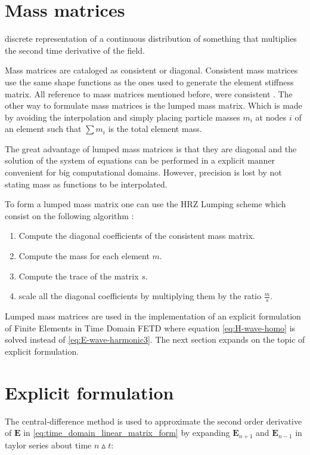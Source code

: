 \section{Mass matrices}
\label{sec:explicit_formulation}
discrete representation of a continuous distribution of something that multiplies the second time derivative of the field.

Mass matrices are cataloged as consistent or diagonal. Consistent mass matrices use the same shape functions as the ones used to generate the element stiffness matrix. All reference to mass matrices mentioned before, were consistent \cite{RobertD.Cook1989}. 
The other way to formulate mass matrices is the lumped mass matrix. Which is made by avoiding the interpolation and simply placing particle masses $m_i$ at nodes $i$ of an element such that $\sum m_i$ is the total element mass. 

The great advantage of lumped mass matrices is that they are diagonal and the solution of the system of equations can be performed in a explicit manner convenient for big computational domains.
However, precision is lost by not stating mass as functions to be interpolated. 

To form a lumped mass matrix one can use the HRZ Lumping scheme 
which consist on the following algorithm \cite{RobertD.Cook1989}:

\begin{enumerate}
\item Compute the diagonal coefficients of the consistent mass matrix.
\item Compute the mass for each element $m$.
\item Compute the trace of the matrix $s$.
\item scale all the diagonal coefficients by multiplying them by the ratio $\frac{m}{s}$.
\end{enumerate}
Lumped mass matrices are used in the implementation of an explicit formulation of Finite Elements in Time Domain FETD where equation \ref{eq:H-wave-homo} is solved instead of \ref{eq:E-wave-harmonic3}. The next section expands on the topic of explicit formulation.

\section{Explicit formulation}

The central-difference method is used to approximate the second order derivative of $\mathbf{E}$ in \ref{eq:time_domain_linear_matrix_form} by expanding $\mathbf{E}_{n+1}$ and $\mathbf{E}_{n-1}$  in taylor series about time $n \vartriangle t$:

